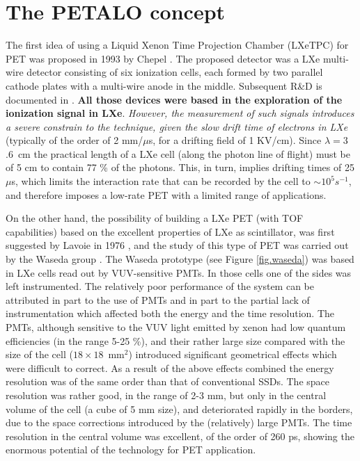 
\section{The PETALO concept}
\label{sec.petalo}

The first idea of using a Liquid Xenon Time Projection Chamber (LXeTPC) for PET was proposed in 1993 by Chepel \cite{chepel02}. The proposed detector was a LXe multi-wire detector consisting of six ionization cells, each formed by two parallel cathode plates with a multi-wire anode in the middle. 
Subsequent R\&D is documented in \cite{chepel94,chepel95,lopes95,chepel97,crespo98,chepel99,crespo00}. {\bf All those devices were based in the exploration of the ionization signal in LXe}. {\em However, the measurement of such signals introduces a severe constrain to the technique, given the slow drift time of electrons in LXe} (typically of the order of 2 mm/$\mu$s, for a drifting field of 1 KV/cm). Since $\lambda = 3$.6~cm the practical length of a LXe cell (along the photon line of flight) must be of 5 cm to contain 77 \% of the photons. This, in turn, implies drifting times of 25 $\mu$s, which limits the interaction rate that can be recorded by the cell to $\sim10^5 s^{-1}$, and therefore imposes a low-rate PET with a limited range of applications. 

On the other hand, the possibility of building a LXe PET (with TOF capabilities) based on the excellent properties of LXe as scintillator, was first suggested by Lavoie in 1976 \cite{lavoie76} , and the study of this type of PET was carried out by the Waseda group \cite{doke06,nishikido05,nishikido04}. The Waseda prototype (see Figure \ref{fig.waseda}) was based in LXe cells read out by VUV-sensitive PMTs. In those cells one of the sides was left instrumented. The relatively poor performance of the system can be attributed in part to the use of PMTs and in part to the partial lack of instrumentation which affected both the energy and the time resolution. The PMTs, although sensitive to the VUV light emitted by xenon had low quantum efficiencies (in the range 5-25 \%), and their rather large size compared with the size of the cell ($18\times 18$~mm$^2$) introduced significant geometrical effects which were difficult to correct. As a result of the above effects combined the energy resolution was of the same order than that of conventional SSDs. The space resolution was rather good, in the range of 2-3 mm, but only in the central volume of the cell (a cube of 5 mm size), and deteriorated rapidly in the borders, due to the space corrections introduced by the (relatively) large PMTs. The time resolution in the central volume was excellent, of the order of 260 ps, showing the enormous potential of the technology for PET application.


